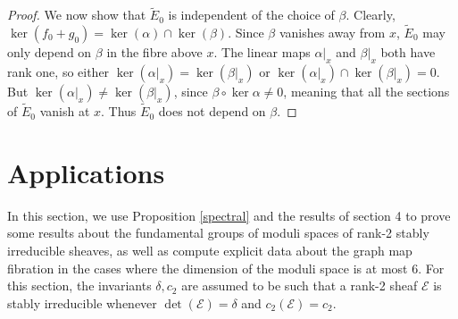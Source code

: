 \documentclass{article}[12pt]
\theoremstyle{definition}
\theoremstyle{remark}
\numberwithin{equation}{section}
\newcommand \mc{\mathcal}
\begin{document}
\begin{proof}
	We now show that $\tilde{E}_0$ is independent of the choice of $\beta$. Clearly, $\ker(f_0+g_0)=\ker(\alpha)\cap \ker(\beta)$. Since $\beta$ vanishes away from $x$, $\tilde{E}_0$ may only depend on $\beta$ in the fibre above $x$. The linear maps $\alpha|_{x}$ and $\beta|_{x}$ both have rank one, so either $\ker(\alpha|_{x})=\ker(\beta|_{x})$ or $\ker(\alpha|_{x})\cap \ker(\beta|_{x})=0$. But $\ker(\alpha|_{x})\neq \ker(\beta|_{x})$, since $\beta\circ \ker\alpha\neq 0$, meaning that all the sections of $\tilde{E}_0$ vanish at $x$. Thus $\tilde{E}_0$ does not depend on $\beta$. 
\end{proof}


\section{Applications}\label{Applications}
In this section, we use Proposition \ref{spectral} and the results of section 4 to prove some results about the fundamental groups of moduli spaces of rank-2 stably irreducible sheaves, as well as compute explicit data about the graph map fibration in the cases where the dimension of the moduli space is at most 6. For this section, the invariants $\delta,c_2$ are assumed to be such that a rank-2 sheaf $\mc{E}$ is stably irreducible whenever $\det(\mc{E})=\delta$ and $c_2(\mc{E})=c_2$.
\end{document}
